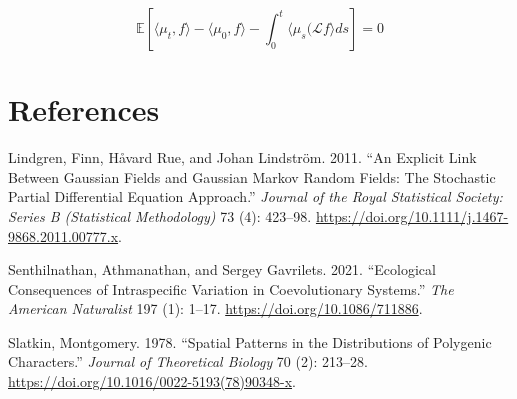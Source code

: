 \documentclass{article}
\newlength{\cslhangindent}
\newenvironment{CSLReferences}[2] %
 {%
  \setlength{\parindent}{0pt}
  \ifodd #1 \everypar{\setlength{\hangindent}{\cslhangindent}}\ignorespaces\fi
  \ifnum #2 > 0
  \setlength{\parskip}{#2\baselineskip}
  \fi
 }%
 {}
\begin{document}
\[\mathbb E\left[\langle\mu_t,f\rangle-\langle\mu_0,f\rangle-\int_0^t\langle\mu_s(\mathcal L f\rangle ds\right]=0\]

\newpage

\hypertarget{references}{%
\section*{References}\label{references}}

\hypertarget{refs}{}
\begin{CSLReferences}{1}{0}
\leavevmode{}%
Lindgren, Finn, Håvard Rue, and Johan Lindström. 2011. {``An Explicit
Link Between Gaussian Fields and Gaussian Markov Random Fields: The
Stochastic Partial Differential Equation Approach.''} \emph{Journal of
the Royal Statistical Society: Series B (Statistical Methodology)} 73
(4): 423--98. \url{https://doi.org/10.1111/j.1467-9868.2011.00777.x}.

\leavevmode{}%
Senthilnathan, Athmanathan, and Sergey Gavrilets. 2021. {``Ecological
Consequences of Intraspecific Variation in Coevolutionary Systems.''}
\emph{The American Naturalist} 197 (1): 1--17.
\url{https://doi.org/10.1086/711886}.

\leavevmode{}%
Slatkin, Montgomery. 1978. {``Spatial Patterns in the Distributions of
Polygenic Characters.''} \emph{Journal of Theoretical Biology} 70 (2):
213--28. \url{https://doi.org/10.1016/0022-5193(78)90348-x}.

\end{CSLReferences}



\end{document}
